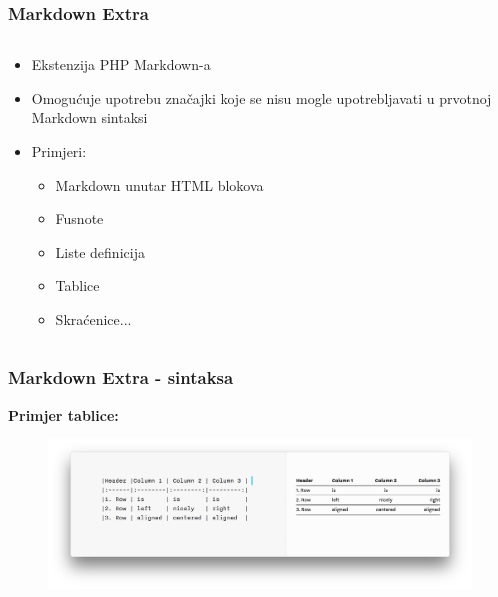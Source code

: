 \documentclass{beamer}
\begin{document}
\begin{frame}
	\frametitle{Markdown Extra}

 	\begin{minipage}[0.2\textheight]{\textwidth}
 	\begin{columns}[T]
 	\begin{column}{0.8\textwidth}
 	\begin{itemize}
 		\item{Ekstenzija PHP Markdown-a}
		\item{Omogućuje upotrebu značajki koje se nisu mogle upotrebljavati u prvotnoj Markdown sintaksi}
		\item{Primjeri: 
		\begin{itemize}
			\item{Markdown unutar HTML blokova}
			\item{Fusnote}
			\item{Liste definicija}
			\item{Tablice}
			\item{Skraćenice}...
		\end{itemize}}
	\end{itemize}
	\end{column}
	\end{columns}
	\end{minipage}

\end{frame}

\begin{frame}[fragile]
\frametitle{Markdown Extra - sintaksa}

\textbf{Primjer tablice:}
\begin{figure}[htbp]
	\includegraphics[width=1.1\textwidth]{Slike/table.png}
	
	\end{figure}


\end{frame}
\end{document}
